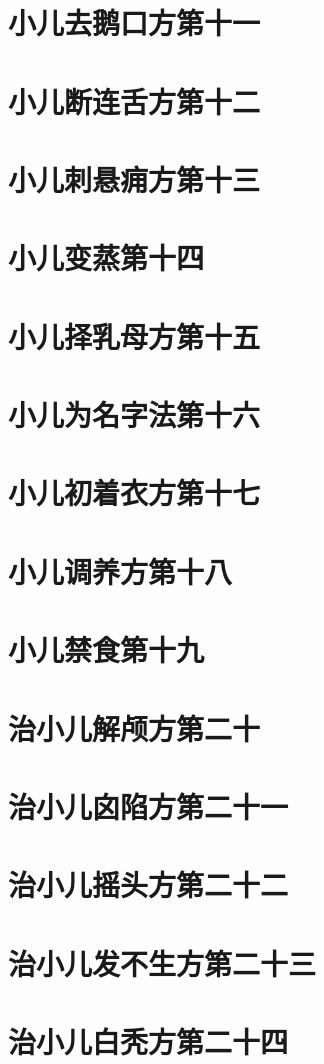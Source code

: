 \documentclass[a4paper,12pt,UTF8,twoside]{ctexbook}
\begin{document}
\chapter{小儿去鹅口方第十一}
\chapter{小儿断连舌方第十二}
\chapter{小儿刺悬痈方第十三}
\chapter{小儿变蒸第十四}
\chapter{小儿择乳母方第十五}
\chapter{小儿为名字法第十六}
\chapter{小儿初着衣方第十七}
\chapter{小儿调养方第十八}
\chapter{小儿禁食第十九}
\chapter{治小儿解颅方第二十}
\chapter{治小儿囟陷方第二十一}
\chapter{治小儿摇头方第二十二}
\chapter{治小儿发不生方第二十三}
\chapter{治小儿白秃方第二十四}
\end{document}
